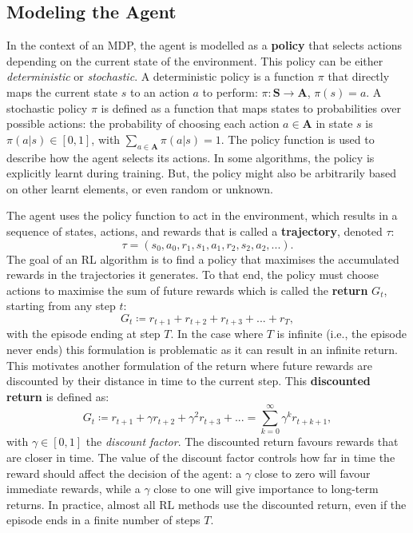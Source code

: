 \subsection{Modeling the Agent}\label{sec:RL:Agent}

In the context of an MDP, the agent is modelled as a \textbf{policy} that selects actions depending on the current state of the environment. This policy can be either \textit{deterministic} or \textit{stochastic}. A deterministic policy is a function $\pi$ that directly maps the current state $s$ to an action $a$ to perform: $\pi:\mathbf{S}\rightarrow\mathbf{A}$, $\pi(s)=a$. A stochastic policy $\pi$ is defined as a function that maps states to probabilities over possible actions: the probability of choosing each action $a\in\mathbf{A}$ in state $s$ is $\pi(a|s)\in[0,1]$, with $\sum_{a\in\mathbf{A}}\pi(a|s)=1$. The policy function is used to describe how the agent selects its actions. In some algorithms, the policy is explicitly learnt during training. But, the policy might also be arbitrarily based on other learnt elements, or even random or unknown. 

The agent uses the policy function to act in the environment, which results in a sequence of states, actions, and rewards that is called a \textbf{trajectory}, denoted $\tau$:
\begin{equation}
\tau=(s_0,a_0,r_1,s_1,a_1,r_2,s_2,a_2,...).
\end{equation}
The goal of an RL algorithm is to find a policy that maximises the accumulated rewards in the trajectories it generates. To that end, the policy must choose actions to maximise the sum of future rewards which is called the \textbf{return} $G_t$, starting from any step $t$:
\begin{equation}
G_t\coloneqq r_{t+1}+r_{t+2}+r_{t+3}+...+r_T,
\end{equation}
with the episode ending at step $T$. In the case where $T$ is infinite (i.e., the episode never ends) this formulation is problematic as it can result in an infinite return. This motivates another formulation of the return where future rewards are discounted by their distance in time to the current step. This \textbf{discounted return} is defined as:
\begin{equation}\label{eq:return}
    G_t\coloneqq r_{t+1}+\gamma r_{t+2}+\gamma^2 r_{t+3}+...=\sum_{k=0}^{\infty}\gamma^k r_{t+k+1},
\end{equation}
with $\gamma\in[0,1]$ the \textit{discount factor}. The discounted return favours rewards that are closer in time. The value of the discount factor controls how far in time the reward should affect the decision of the agent: a $\gamma$ close to zero will favour immediate rewards, while a $\gamma$ close to one will give importance to long-term returns. In practice, almost all RL methods use the discounted return, even if the episode ends in a finite number of steps $T$. 

